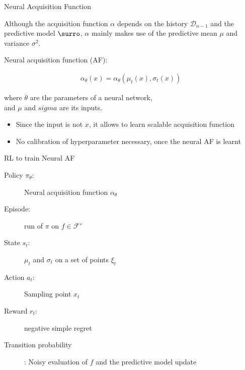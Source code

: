 \begin{frame}[c]{Neural Acquisition Function }

Although the acquisition function $\alpha$ depends on the history $\mathcal{D}_{n-1}$ and the predictive model $\surro$, $\alpha$ mainly makes use of the predictive mean $\mu$ and variance $\sigma^2$.

\pause
\bigskip

Neural acquisition function (AF):

\begin{eqnarray}
\alpha_\theta(x) = \alpha_\theta(\mu_t(x), \sigma_t(x)) \nonumber
\end{eqnarray}

where $\theta$ are the parameters of a neural network,\\ and $\mu$ and $sigma$ are its inputs.

\begin{itemize}
	\item Since the input is not $x$, it allows to learn scalable acquisition function
	\item No calibration of hyperparameter necessary, once the neural AF is learnt
\end{itemize}

\end{frame}
\begin{frame}[c]{RL to train Neural AF }

\begin{description}
	\item[Policy $\pi_\theta$:] Neural acquisition function $\alpha_\theta$
	\pause
	\item[Episode:] run of $\pi$ on $f\in \mathcal{F}'$
	\pause
	\item[State $s_t$:] $\mu_t$ and $\sigma_t$ on a set of points $\xi_t$
	\pause
	\item[Action $a_t$:] Sampling point $x_t$
	\pause
	\item[Reward $r_t$:] negative simple regret
	\pause
	\item[Transition probability]: Noisy evaluation of $f$ and the predictive model update
\end{description}

\end{frame}

